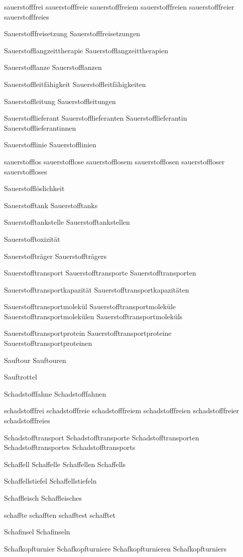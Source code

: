 sauerstofffrei
sauerstofffreie
sauerstofffreiem
sauerstofffreien
sauerstofffreier
sauerstofffreies

Sauerstofffreisetzung
Sauerstofffreisetzungen

Sauerstofflangzeittherapie
Sauerstofflangzeittherapien

Sauerstofflanze
Sauerstofflanzen

Sauerstoffleitfähigkeit
Sauerstoffleitfähigkeiten

Sauerstoffleitung
Sauerstoffleitungen

Sauerstofflieferant
Sauerstofflieferanten
Sauerstofflieferantin
Sauerstofflieferantinnen

Sauerstofflinie
Sauerstofflinien

sauerstofflos
sauerstofflose
sauerstofflosem
sauerstofflosen
sauerstoffloser
sauerstoffloses

Sauerstofflöslichkeit

Sauerstofftank
Sauerstofftanks

Sauerstofftankstelle
Sauerstofftankstellen

Sauerstofftoxizität

Sauerstoffträger
Sauerstoffträgers

Sauerstofftransport
Sauerstofftransporte
Sauerstofftransporten

Sauerstofftransportkapazität
Sauerstofftransportkapazitäten

Sauerstofftransportmolekül
Sauerstofftransportmoleküle
Sauerstofftransportmolekülen
Sauerstofftransportmoleküls

Sauerstofftransportprotein
Sauerstofftransportproteine
Sauerstofftransportproteinen

Sauftour
Sauftouren

Sauftrottel

Schadstofffahne
Schadstofffahnen

schadstofffrei
schadstofffreie
schadstofffreiem
schadstofffreien
schadstofffreier
schadstofffreies

Schadstofftransport
Schadstofftransporte
Schadstofftransporten
Schadstofftransportes
Schadstofftransports

Schaffell
Schaffelle
Schaffellen
Schaffells

Schaffellstiefel
Schaffellstiefeln

Schaffleisch
Schaffleisches

schaffte
schafften
schafftest
schafftet

Schafinsel
Schafinseln

Schafkopfturnier
Schafkopfturniere
Schafkopfturnieren
Schafkopfturniers

